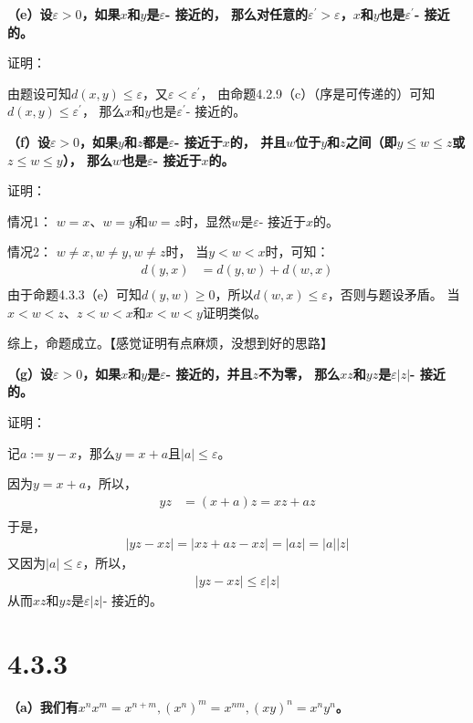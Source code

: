 \documentclass{article}
\theoremstyle{mystyle}
\begin{document}
\textbf{（e）设$\varepsilon>0$，如果$x$和$y$是$\varepsilon$- 接近的，
  那么对任意的$\varepsilon^\prime > \varepsilon$，$x$和$y$也是$\varepsilon^\prime$- 接近的。}

证明：

由题设可知$d(x,y) \leq \varepsilon$，又$\varepsilon < \varepsilon^\prime$，
由命题4.2.9（c）（序是可传递的）可知$d(x,y) \leq \varepsilon^\prime$，
那么$x$和$y$也是$\varepsilon^\prime$- 接近的。

\textbf{（f）设$\varepsilon>0$，如果$y$和$z$都是$\varepsilon$- 接近于$x$的，
  并且$w$位于$y$和$z$之间（即$y \leq w \leq z$或$z \leq w \leq y$），
  那么$w$也是$\varepsilon$- 接近于$x$的。}

证明：

情况1：
$w=x$、$w=y$和$w=z$时，显然$w$是$\varepsilon$- 接近于$x$的。

情况2：
$w \neq x, w \neq y, w \neq z$时，
当$y < w < x$时，可知：
\begin{align*}
  d(y,x) & = d(y,w) + d(w,x) \\
\end{align*}
由于命题4.3.3（e）可知$d(y,w) \geq 0$，所以$d(w,x) \leq \varepsilon$，否则与题设矛盾。
当$x<w<z$、$z<w<x$和$x<w<y$证明类似。

综上，命题成立。【感觉证明有点麻烦，没想到好的思路】

\textbf{（g）设$\varepsilon>0$，如果$x$和$y$是$\varepsilon$- 接近的，并且$z$不为零，
  那么$xz$和$yz$是$\varepsilon|z|$- 接近的。}

证明：

记$a:=y-x$，那么$y=x+a$且$|a| \leq \varepsilon$。

因为$y=x+a$，所以，
\begin{align*}
  yz & = (x+a)z = xz + az \\
\end{align*}
于是，
\begin{align*}
  |yz - xz| = |xz + az - xz| = |az| = |a||z|
\end{align*}
又因为$|a| \leq \varepsilon$，所以，
\begin{align*}
  |yz - xz| \leq \varepsilon|z|
\end{align*}
从而$xz$和$yz$是$\varepsilon|z|$- 接近的。

\section*{4.3.3}

\textbf{（a）我们有$x^n x^m = x^{n+m}, (x^n)^m = x^{nm}, (xy)^n = x^n y^n$。}
\end{document}
